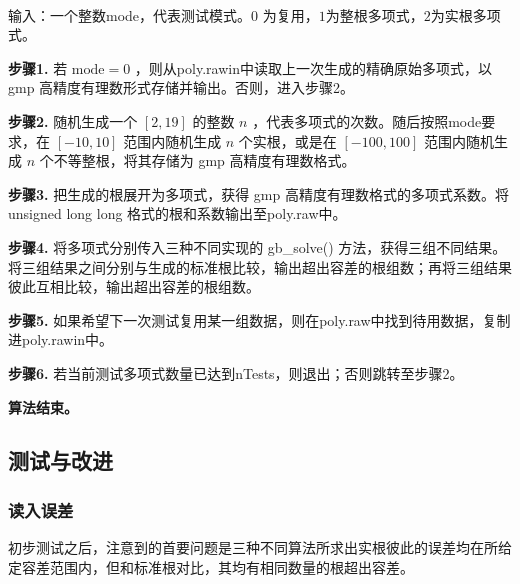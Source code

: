 	\begin{algorithm}[测试方法（简略）]~
		
		输入：一个整数mode，代表测试模式。$0$ 为复用，$1$为整根多项式，$2$为实根多项式。
		
		\textbf{步骤1.} 若 $\textrm{mode} = 0$ ，则从poly.rawin中读取上一次生成的精确原始多项式，以 gmp 高精度有理数形式存储并输出。否则，进入步骤2。
		
		\textbf{步骤2.} 随机生成一个 $[2, 19]$ 的整数 $n$ ，代表多项式的次数。随后按照mode要求，在 $[-10, 10]$ 范围内随机生成 $n$ 个实根，或是在 $[-100, 100]$ 范围内随机生成 $n$ 个不等整根，将其存储为 gmp 高精度有理数格式。
		
		\textbf{步骤3.} 把生成的根展开为多项式，获得 gmp 高精度有理数格式的多项式系数。将 unsigned long long 格式的根和系数输出至poly.raw中。
		
		\textbf{步骤4.} 将多项式分别传入三种不同实现的 gb\_solve() 方法，获得三组不同结果。将三组结果之间分别与生成的标准根比较，输出超出容差的根组数；再将三组结果彼此互相比较，输出超出容差的根组数。
		
		\textbf{步骤5.} 如果希望下一次测试复用某一组数据，则在poly.raw中找到待用数据，复制进poly.rawin中。
		
		\textbf{步骤6.} 若当前测试多项式数量已达到nTests，则退出；否则跳转至步骤2。
		
		\textbf{算法结束。}
		
		
	\end{algorithm}


\subsection{测试与改进}

	\subsubsection*{读入误差}

	初步测试之后，注意到的首要问题是三种不同算法所求出实根彼此的误差均在所给定容差范围内，但和标准根对比，其均有相同数量的根超出容差。
	
